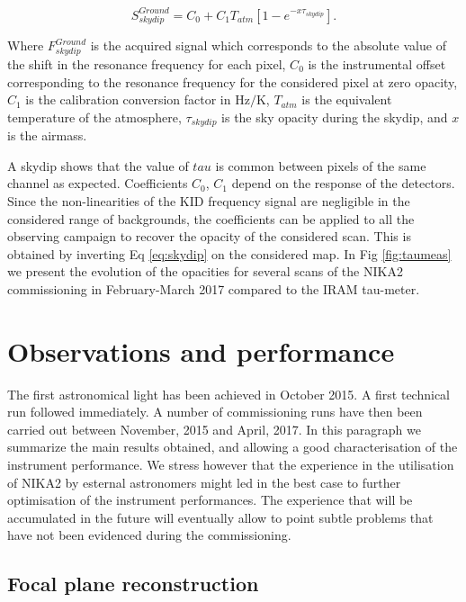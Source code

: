 \documentclass[]{aa} %
\begin{document}
\begin{equation}\label{eq:skydip}
S^{Ground}_{skydip} = C_0 + C_1 T_{atm}[1 - e^{- x \tau_{skydip}}].
\end{equation}

Where $F^{Ground}_{skydip}$ is the acquired signal which corresponds to the
absolute value of the shift in the resonance frequency for each pixel, $C_0$ is the
instrumental offset corresponding to the resonance frequency for the
considered pixel at zero opacity, $C_1$ is the calibration conversion factor in
$\mathrm{Hz/K}$, $T_{atm}$ is the equivalent temperature of the
atmosphere, $\tau_{skydip}$ is the sky opacity during the skydip, and $x$ is the airmass.

A skydip shows that the value of $tau$ is common between pixels of the same channel as expected. Coefficients  $C_0$, $C_1$ depend on the response of the detectors. Since the non-linearities of the KID frequency signal are negligible in the considered range of backgrounds, the coefficients can be applied to all the observing campaign to recover the opacity of the considered scan. This is
obtained by inverting Eq \ref{eq:skydip} on the considered map. In Fig \ref{fig:taumeas} we present the evolution of the opacities for several scans of the NIKA2 commissioning  in February-March 2017 compared to the IRAM tau-meter.


\section{Observations and performance}

The first astronomical light has been achieved in October 2015. A first technical run followed immediately. A number of commissioning runs have then been carried out between November, 2015 and April, 2017. In this paragraph we summarize the main results obtained, and allowing a good characterisation of the instrument performance. We stress however that the experience in the utilisation of NIKA2 by esternal astronomers might led in the best case to further optimisation of the instrument performances. The experience that will be accumulated in the future will eventually allow to point subtle problems that have not been evidenced during the commissioning. 

\subsection{Focal plane reconstruction}
\end{document}

